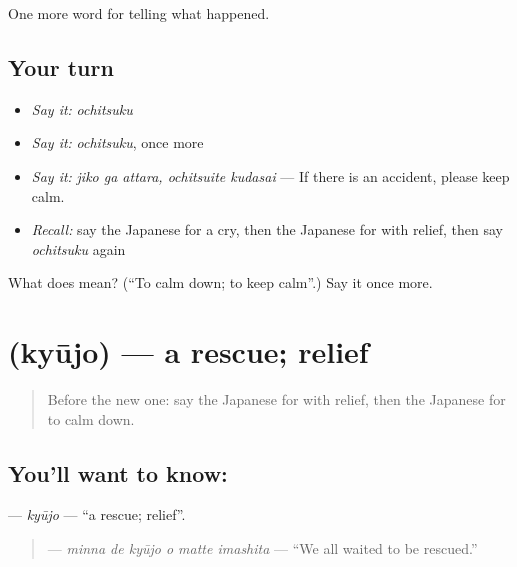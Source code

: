 \begin{grammarlens}[title={What you've built}]
One more word for telling what happened.
\end{grammarlens}

\subsection*{Your turn}
\begin{itemize}
\raggedright
  \item \emph{Say it:} \emph{ochitsuku}
  \item \emph{Say it:} \emph{ochitsuku}, once more
  \item \emph{Say it:} \emph{jiko ga attara, ochitsuite kudasai} — If there is an accident, please keep calm.
  \item \emph{Recall:} say the Japanese for a cry, then the Japanese for with relief, then say \emph{ochitsuku} again
\end{itemize}

\begin{tcolorbox}[breakable,colback=teal!4,colframe=teal!35!black,title={Before you move on}]
What does  mean? (\textquotedblleft{}To calm down; to keep calm\textquotedblright{}.) Say it once more.
\end{tcolorbox}
\section[\texorpdfstring{\ja{きゅうじょ} (kyūjo)}{きゅうじょ (kyūjo)}]{ (kyūjo) — a rescue; relief}

\label{lesson:JA-C268-kyuujo}



\begin{quote}
Before the new one: say the Japanese for with relief, then the Japanese for to calm down.
\end{quote}

\subsection*{You'll want to know: }
\textbf{} — \emph{kyūjo} — \textquotedblleft{}a rescue; relief\textquotedblright{}.

\begin{quote}
\textbf{  } — \emph{minna de kyūjo o matte imashita} — \textquotedblleft{}We all waited to be rescued.\textquotedblright{}
\end{quote}

